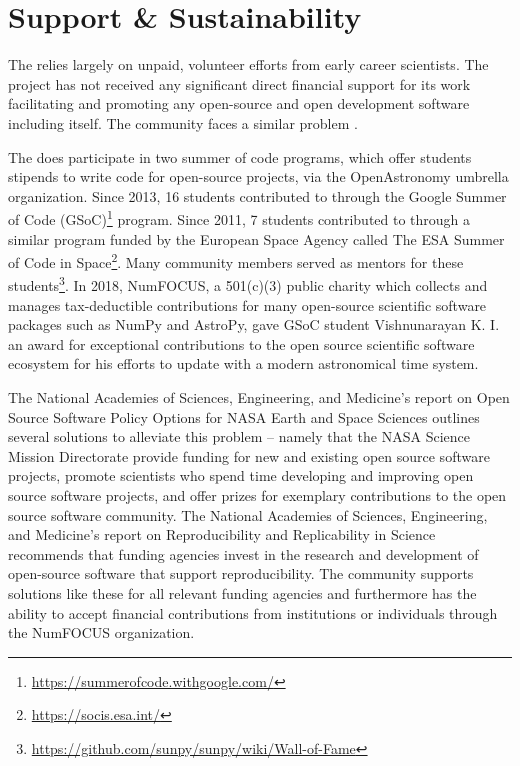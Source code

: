 \section{Support \& Sustainability}
\label{sec:intro:support}

The \sunpyproj relies largely on unpaid, volunteer efforts from early career scientists.
The project has not received any significant direct financial support for its work facilitating and promoting any open-source and open development software including \sunpy itself.
The \astropy community faces a similar problem \citep{PriceWhelan:2018ji, Muna2016}.

The \sunpyproj does participate in two summer of code programs, which offer students stipends to write code for open-source projects, via the OpenAstronomy umbrella organization.
Since 2013, 16 students contributed to \sunpy through the Google Summer of Code (GSoC)\footnote{\url{https://summerofcode.withgoogle.com/}} program.
Since 2011, 7 students contributed to \sunpy through a similar program funded by the European Space Agency called The ESA Summer of Code in Space\footnote{\url{https://socis.esa.int/}}.
Many \sunpy community members served as mentors for these students\footnote{\url{https://github.com/sunpy/sunpy/wiki/Wall-of-Fame}}.
In 2018, NumFOCUS, a 501(c)(3) public charity which collects and manages tax-deductible contributions for many open-source scientific software packages such as NumPy and AstroPy, gave GSoC student Vishnunarayan K. I. an award for exceptional contributions to the open source scientific software ecosystem for his efforts to update \sunpy with a modern astronomical time system.

The National Academies of Sciences, Engineering, and Medicine's report on Open Source Software Policy Options for NASA Earth and Space Sciences \citep{NAP2018} outlines several solutions to alleviate this problem -- namely that the NASA Science Mission Directorate provide funding for new and existing open source software projects, promote scientists who spend time developing and improving open source software projects, and offer prizes for exemplary contributions to the open source software community.
The National Academies of Sciences, Engineering, and Medicine's report on Reproducibility and Replicability in Science \citep{NAP2019} recommends that funding agencies invest in the research and development of open-source software that support reproducibility.
The \sunpy community supports solutions like these for all relevant funding agencies and furthermore has the ability to accept financial contributions from institutions or individuals through the NumFOCUS organization.

